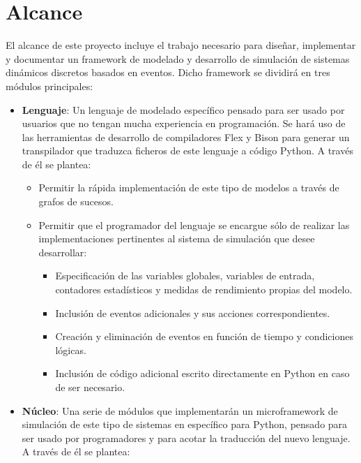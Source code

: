 \section{Alcance}\label{sec:alcance}

El alcance de este proyecto incluye el trabajo necesario para diseñar,
implementar y documentar un framework de modelado y desarrollo de simulación de
sistemas dinámicos discretos basados en eventos. Dicho framework se dividirá en
tres módulos principales:
\begin{itemize}
    \item \textbf{Lenguaje}: Un lenguaje de modelado específico pensado para ser usado
    por usuarios que no tengan mucha experiencia en programación. Se hará uso de
    las herramientas de desarrollo de compiladores Flex y Bison para generar un
    transpilador que traduzca ficheros de este lenguaje a código Python. A
    través de él se plantea:
    \begin{itemize}
        \item Permitir la rápida implementación de este tipo de modelos a través
        de grafos de sucesos.
        \item Permitir que el programador del lenguaje se encargue sólo de
        realizar las implementaciones pertinentes al sistema de simulación que
        desee desarrollar:
        \begin{itemize}
            \item Especificación de las variables globales, variables de
            entrada, contadores estadísticos y medidas de rendimiento propias
            del modelo.
            \item Inclusión de eventos adicionales y sus acciones
            correspondientes.
            \item Creación y eliminación de eventos en función de tiempo y
            condiciones lógicas.
            \item Inclusión de código adicional escrito directamente en Python
            en caso de ser necesario.
        \end{itemize}
    \end{itemize}
    \item \textbf{Núcleo}: Una serie de módulos que implementarán un microframework de
    simulación de este tipo de sistemas en específico para Python, pensado para
    ser usado por programadores y para acotar la traducción del nuevo lenguaje.
    A través de él se plantea:
    \begin{itemize}

\end{itemize}
\end{itemize}
